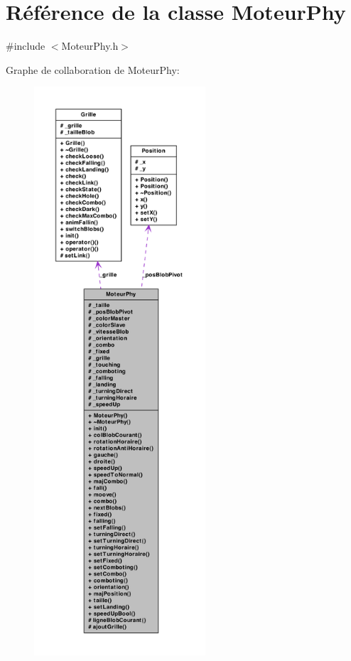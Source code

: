 \hypertarget{a00013}{
\section{Référence de la classe MoteurPhy}
\label{a00013}
}


{\ttfamily \#include $<$MoteurPhy.h$>$}



Graphe de collaboration de MoteurPhy:
\nopagebreak
\begin{figure}[H]
\begin{center}
\leavevmode
\includegraphics[height=600pt]{a00094}
\end{center}
\end{figure}
